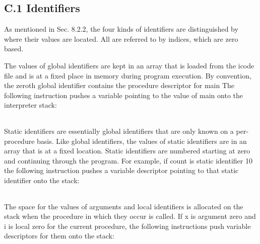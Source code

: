 \begin{noIndex}
  
\section{C.1 Identifiers}

As mentioned in Sec. 8.2.2, the four kinds of identifiers are
distinguished by where their values are located. All are referred to
by indices, which are zero based.


The values of global identifiers are kept in an array that is loaded
from the icode file and is at a fixed place in memory during program
execution. By convention, the zeroth global identifier contains the
procedure descriptor for main The following instruction pushes a
variable pointing to the value of main onto the interpreter stack:

\begin{flushleft}
\tablelasttail{\hline}
\begin{xtabular}{|m{1.9066598in}|m{2.75596in}|}

\end{xtabular}
\end{flushleft}

Static identifiers are essentially global identifiers that are only
known on a per-procedure basis. Like global identifiers, the values of
static identifiers are in an array that is at a fixed location. Static
identifiers are numbered starting at zero and continuing through the
program. For example, if count is static identifier 10 the following
instruction pushes a variable descriptor pointing to that static
identifier onto the stack:

\begin{flushleft}
\tablelasttail{\hline}
\begin{xtabular}{|m{1.9066598in}|m{2.75596in}|}

\end{xtabular}
\end{flushleft}

The space for the values of arguments and local identifiers is
allocated on the stack when the procedure in which they occur is
called. If x is argument zero and i is local zero for the current
procedure, the following instructions push variable descriptors for
them onto the stack:


\end{noIndex}

